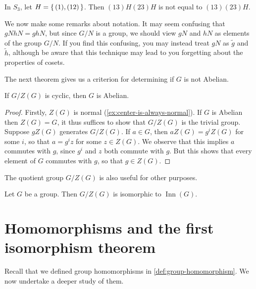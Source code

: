 \documentclass[./main.tex]{subfiles}
\begin{document}
\begin{example}
    In $S_3$, let $H = \set{(1), (12)}$. Then $(13) H (23) H$ is not equal to
    $(13)(23)H$.
\end{example}

We now make some remarks about notation. It may seem confusing that $gN hN =
ghN$, but since $G/N$ is a group, we should view $gN$ and $hN$ as elements of
the group $G/N$. If you find this confusing, you may instead treat $gN$ as
$\tilde g$ and $\tilde h$, although be aware that this technique may lead to you
forgetting about the properties of cosets.

The next theorem gives us a criterion for determining if $G$ is not Abelian. 
\begin{theorem}
\label{thm:g-z-theorem}
    If $G/Z(G)$ is cyclic, then $G$ is Abelian.
\end{theorem}
\begin{proof}
    Firstly, $Z(G)$ is normal (\cref{ex:center-is-always-normal}). If $G$ is
    Abelian then $Z(G) = G$, it thus suffices to show that $G/Z(G)$ is the
    trivial group. Suppose $gZ(G)$ generates $G/Z(G)$. If $a \in G$, then $aZ(G)
    = g^i Z(G)$ for some $i$, so that $a = g^i z$ for some $z \in Z(G)$. We
    observe that this implies $a$ commutes with $g$, since $g^i$ and $z$ both
    commute with $g$. But this shows that every element of $G$ commutes with
    $g$, so that $g \in Z(G)$. 
\end{proof}


The quotient group $G/Z(G)$ is also useful for other purposes. 
\begin{proposition}
\label{prop:structure-of-g-zg}
Let $G$ be a group. Then $G/Z(G)$ is isomorphic to $\operatorname{Inn}(G)$.
\end{proposition}


\section{Homomorphisms and the first isomorphism theorem}
Recall that we defined group homomorphisms in \cref{def:group-homomorphism}. We
now undertake a deeper study of them. 
\end{document}
